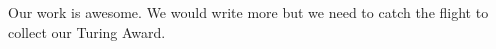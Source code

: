 Our work is awesome. We would write more but we need to catch the flight to collect our Turing Award.